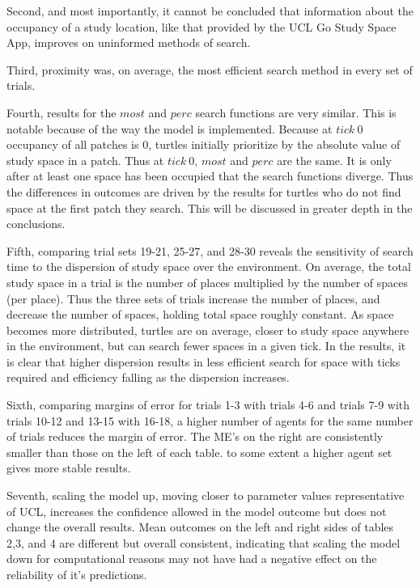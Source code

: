 \documentclass[11pt]{article} %
\begin{document}
Second, and most importantly, it cannot be concluded that information about the occupancy of a study location, like that provided by the UCL Go Study Space App,  improves on uninformed methods of search. 

Third, proximity was, on average, the most efficient search method in every set of trials. 

Fourth, results for the $most$ and $perc$ search functions are very similar. This is notable because of the way the model is implemented. Because at $tick \: 0$ occupancy of all patches is 0, turtles initially prioritize by the absolute value of study space in a patch. Thus at $tick \: 0$, $most$ and $perc$ are the same. It is only after at least one space has been occupied that the search functions diverge. Thus the differences in outcomes are driven by the results for turtles who do not find space at the first patch they search. This will be discussed in greater depth in the conclusions. 

Fifth, comparing trial sets 19-21, 25-27, and 28-30 reveals the sensitivity of search time to the dispersion of study space over the environment. On average, the total study space in a trial is the number of places multiplied by the number of spaces (per place). Thus the three sets of trials increase the number of places, and decrease the number of spaces, holding total space roughly constant. As space becomes more distributed, turtles are on average, closer to study space anywhere in the environment, but can search fewer spaces in a given tick. In the results, it is clear that higher dispersion results in less efficient search for space with ticks required and efficiency falling as the dispersion increases. 

Sixth, comparing margins of error for trials 1-3 with trials 4-6 and trials 7-9 with trials 10-12 and 13-15 with 16-18, a higher number of agents for the same number of trials reduces the margin of error. The ME's on the right are consistently smaller than those on the left of each table. to some extent a higher agent set gives more stable results. 

Seventh, scaling the model up, moving closer to parameter values representative of UCL, increases the confidence allowed in the model outcome but does not change the overall results. Mean outcomes on the left and right sides of tables 2,3, and 4 are different but overall consistent, indicating that scaling the model down for computational reasons may not have had a negative effect on the reliability of it's predictions. 
\end{document}
